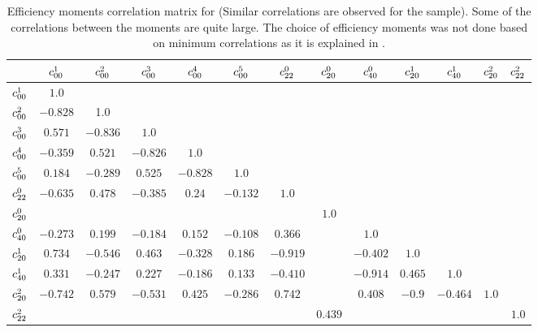 \begin{sidewaystable}[p!]
\centering
\footnotesize
\begin{tabular}{c c c c c c c c c c c c c}
\hline
& $c^{1}_{00}$ & $c^{2}_{00}$ & $c^{3}_{00}$ & $c^{4}_{00}$ & $c^{5}_{00}$ &
  $c^{0}_{22}$ & $c^{0}_{20}$ & $c^{0}_{40}$ & $c^{1}_{20}$ & $c^{1}_{40}$ &
  $c^{2}_{20}$ & $c^{2}_{22}$  \\
\hline
$c^{1}_{00}$   &  $   1.0$  &   &   &   &   &   &   &   &   &   &   &\\
$c^{2}_{00}$   &  $-0.828$  &     1.0  &   &   &   &   &   &   &   &   &  & \\
$c^{3}_{00}$   &  $ 0.571$  &  $-0.836$  & $   1.0$ &  &   &   &   &   &   &   &  & \\
$c^{4}_{00}$   &  $-0.359$  &  $ 0.521$  & $-0.826$ & $   1.0$ &   &   &   &   &   &   &  &  \\
$c^{5}_{00}$   &  $ 0.184$  &  $-0.289$  & $ 0.525$ & $-0.828$ &     $1.0$  &   &   &  &   &   &  &  \\
$c^{0}_{22}$   &  $-0.635$  &  $ 0.478$  & $-0.385$ & $  0.24$ &  $-0.132$ &     $1.0$ &   &   &   &   &   & \\
$c^{0}_{20}$   &            &            &          &          &           &           &  $1.0$  &   &   &   &   & \\
$c^{0}_{40}$   &  $-0.273$  &  $ 0.199$  & $-0.184$ & $ 0.152$ &  $-0.108$ &   $0.366$ &         &     $1.0$  &   &   &   & \\
$c^{1}_{20}$   &  $ 0.734$  &  $-0.546$  & $ 0.463$ & $-0.328$ &   $0.186$ &  $-0.919$ &         &  $-0.402$  &    $1.0$  &           &       &\\
$c^{1}_{40}$   &  $ 0.331$  &  $-0.247$  & $ 0.227$ & $-0.186$ &   $0.133$ &  $-0.410$ &         &  $-0.914$  &   $0.465$ &    $1.0$  &       & \\
$c^{2}_{20}$   &  $-0.742$  &  $ 0.579$  & $-0.531$ & $ 0.425$ &  $-0.286$ &   $0.742$ &         &  $0.408$   &    $-0.9$ &  $-0.464$ & $1.0$ & \\
$c^{2}_{22}$   &            &            &          &          &           &           & $0.439$ &            &           &           &       &     $1.0$\\
\hline
\end{tabular}
\caption{Efficiency moments correlation matrix for \BsJpsiKst (Similar correlations are observed for the \BsbarJpsiKst sample).
         Some of the correlations between the moments are quite large. The choice of efficiency moments was not done based on
          minimum correlations as it is explained in . }
\label{eff_moms_corr}
\end{sidewaystable}


